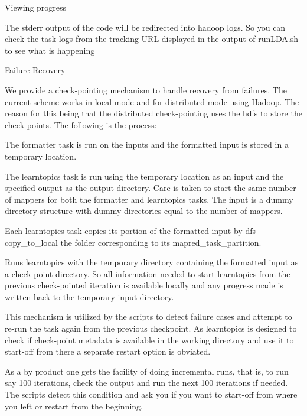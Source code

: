 \begin{DoxyEnumerate}
\begin{DoxyEnumerate}
Viewing progress 
\begin{DoxyEnumerate}
\item 

The stderr output of the code will be redirected into hadoop logs. So you can check the task logs from the tracking URL displayed in the output of runLDA.sh to see what is happening 
\end{DoxyEnumerate}
\item 

Failure Recovery 

We provide a check-\/pointing mechanism to handle recovery from failures. The current scheme works in local mode and for distributed mode using Hadoop. The reason for this being that the distributed check-\/pointing uses the hdfs to store the check-\/points. The following is the process:  
\begin{DoxyEnumerate}
\item The formatter task is run on the inputs and the formatted input is stored in a temporary location. 
\item The learntopics task is run using the temporary location as an input and the specified output as the output directory. Care is taken to start the same number of mappers for both the formatter and learntopics tasks. The input is a dummy directory structure with dummy directories equal to the number of mappers. 
\item Each learntopics task copies its portion of the formatted input by dfs copy\_\-to\_\-local the folder corresponding to its mapred\_\-task\_\-partition. 
\item Runs learntopics with the temporary directory containing the formatted input as a check-\/point directory. So all information needed to start learntopics from the previous check-\/pointed iteration is available locally and any progress made is written back to the temporary input directory. 
\end{DoxyEnumerate}

This mechanism is utilized by the scripts to detect failure cases and attempt to re-\/run the task again from the previous checkpoint. As learntopics is designed to check if check-\/point metadata is available in the working directory and use it to start-\/off from there a separate restart option is obviated.  

As a by product one gets the facility of doing incremental runs, that is, to run say 100 iterations, check the output and run the next 100 iterations if needed. The scripts detect this condition and ask you if you want to start-\/off from where you left or restart from the beginning. 


\end{DoxyEnumerate}
\end{DoxyEnumerate}
